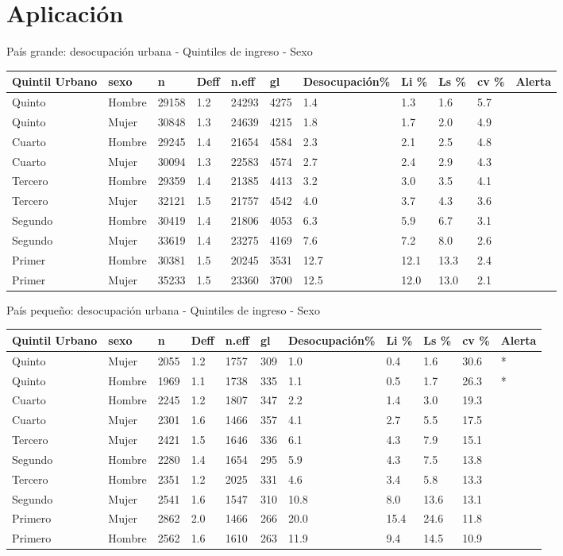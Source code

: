 \documentclass[12pt,spanish,]{book}
\begin{document}
\hypertarget{aplicacion}{%
\section{Aplicación}\label{aplicacion}}

País grande: desocupación urbana - Quintiles de ingreso - Sexo

\begin{longtable}[]{@{}lllllllllll@{}}
\toprule
Quintil Urbano & sexo & n & Deff & n.eff & gl & Desocupación\% & Li \% & Ls \% & cv \% & Alerta\tabularnewline
\midrule
\endhead
Quinto & Hombre & 29158 & 1.2 & 24293 & 4275 & 1.4 & 1.3 & 1.6 & 5.7 &\tabularnewline
Quinto & Mujer & 30848 & 1.3 & 24639 & 4215 & 1.8 & 1.7 & 2.0 & 4.9 &\tabularnewline
Cuarto & Hombre & 29245 & 1.4 & 21654 & 4584 & 2.3 & 2.1 & 2.5 & 4.8 &\tabularnewline
Cuarto & Mujer & 30094 & 1.3 & 22583 & 4574 & 2.7 & 2.4 & 2.9 & 4.3 &\tabularnewline
Tercero & Hombre & 29359 & 1.4 & 21385 & 4413 & 3.2 & 3.0 & 3.5 & 4.1 &\tabularnewline
Tercero & Mujer & 32121 & 1.5 & 21757 & 4542 & 4.0 & 3.7 & 4.3 & 3.6 &\tabularnewline
Segundo & Hombre & 30419 & 1.4 & 21806 & 4053 & 6.3 & 5.9 & 6.7 & 3.1 &\tabularnewline
Segundo & Mujer & 33619 & 1.4 & 23275 & 4169 & 7.6 & 7.2 & 8.0 & 2.6 &\tabularnewline
Primer & Hombre & 30381 & 1.5 & 20245 & 3531 & 12.7 & 12.1 & 13.3 & 2.4 &\tabularnewline
Primer & Mujer & 35233 & 1.5 & 23360 & 3700 & 12.5 & 12.0 & 13.0 & 2.1 &\tabularnewline
\bottomrule
\end{longtable}

País pequeño: desocupación urbana - Quintiles de ingreso - Sexo

\begin{longtable}[]{@{}lllllllllll@{}}
\toprule
Quintil Urbano & sexo & n & Deff & n.eff & gl & Desocupación\% & Li \% & Ls \% & cv \% & Alerta\tabularnewline
\midrule
\endhead
Quinto & Mujer & 2055 & 1.2 & 1757 & 309 & 1.0 & 0.4 & 1.6 & 30.6 & *\tabularnewline
Quinto & Hombre & 1969 & 1.1 & 1738 & 335 & 1.1 & 0.5 & 1.7 & 26.3 & *\tabularnewline
Cuarto & Hombre & 2245 & 1.2 & 1807 & 347 & 2.2 & 1.4 & 3.0 & 19.3 &\tabularnewline
Cuarto & Mujer & 2301 & 1.6 & 1466 & 357 & 4.1 & 2.7 & 5.5 & 17.5 &\tabularnewline
Tercero & Mujer & 2421 & 1.5 & 1646 & 336 & 6.1 & 4.3 & 7.9 & 15.1 &\tabularnewline
Segundo & Hombre & 2280 & 1.4 & 1654 & 295 & 5.9 & 4.3 & 7.5 & 13.8 &\tabularnewline
Tercero & Hombre & 2351 & 1.2 & 2025 & 331 & 4.6 & 3.4 & 5.8 & 13.3 &\tabularnewline
Segundo & Mujer & 2541 & 1.6 & 1547 & 310 & 10.8 & 8.0 & 13.6 & 13.1 &\tabularnewline
Primero & Mujer & 2862 & 2.0 & 1466 & 266 & 20.0 & 15.4 & 24.6 & 11.8 &\tabularnewline
Primero & Hombre & 2562 & 1.6 & 1610 & 263 & 11.9 & 9.4 & 14.5 & 10.9 &\tabularnewline
\bottomrule
\end{longtable}
\end{document}
